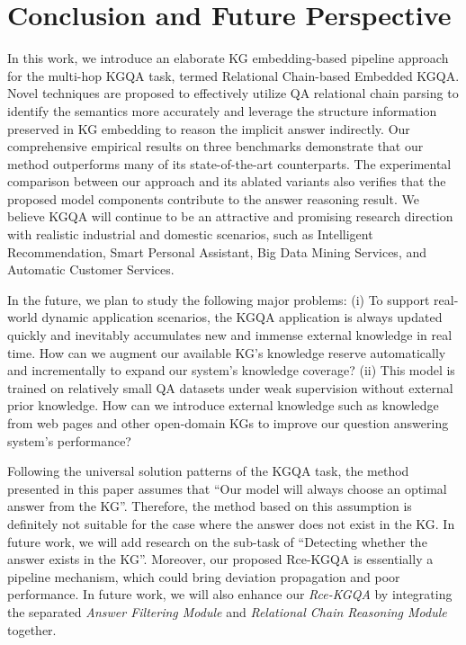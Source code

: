 \documentclass[pdflatex,sn-mathphys]{sn-jnl}%
\theoremstyle{thmstyleone}%
\theoremstyle{thmstyletwo}%
\theoremstyle{thmstylethree}%
\begin{document}
\section{Conclusion and Future Perspective}
\label{conclusion}
In this work, we introduce an elaborate KG embedding-based pipeline approach for the multi-hop KGQA task, termed Relational Chain-based Embedded KGQA. Novel techniques are proposed to effectively utilize QA relational chain parsing to identify the semantics more accurately and leverage the structure information preserved in KG embedding to reason the implicit answer indirectly.
Our comprehensive empirical results on three benchmarks demonstrate that our method outperforms many of its state-of-the-art counterparts. The experimental comparison between our approach and its ablated variants also verifies that the proposed model components contribute to the answer reasoning result.
We believe KGQA will continue to be an attractive and promising research direction with realistic industrial and domestic scenarios, such as Intelligent Recommendation, Smart Personal Assistant, Big Data Mining Services, and Automatic Customer Services.

In the future, we plan to study the following major problems: (i) To support real-world dynamic application scenarios, the KGQA application is always updated quickly and inevitably accumulates new and immense external knowledge in real time. How can we augment our available KG's knowledge reserve automatically and incrementally to expand our system's knowledge coverage? (ii) This model is trained on relatively small QA datasets under weak supervision without external prior knowledge. How can we introduce external knowledge such as knowledge from web pages and other open-domain KGs to improve our question answering system's performance?

Following the universal solution patterns of the KGQA task, the method presented in this paper assumes that ``Our model will always choose an optimal answer from the KG''. Therefore, the method based on this assumption is definitely not suitable for the case where the answer does not exist in the KG. In future work, we will add research on the sub-task of ``Detecting whether the answer exists in the KG''. Moreover, our proposed Rce-KGQA is essentially a pipeline mechanism, which could bring deviation propagation and poor performance. In future work, we will also enhance our \textit{Rce-KGQA} by integrating the separated \textit{Answer Filtering Module} and \textit{Relational Chain Reasoning Module} together.
\end{document}
